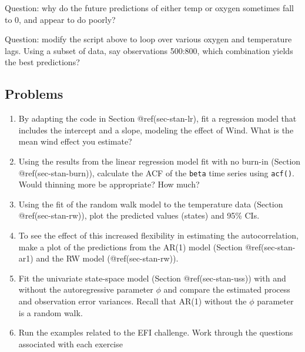 \documentclass[
]{article}
\begin{document}
Question: why do the future predictions of either temp or oxygen
sometimes fall to 0, and appear to do poorly?

Question: modify the script above to loop over various oxygen and
temperature lags. Using a subset of data, say observations 500:800,
which combination yields the best predictions?

\clearpage

\hypertarget{sec-stan-problems}{%
\subsection{Problems}\label{sec-stan-problems}}

\begin{enumerate}
\def\labelenumi{\arabic{enumi}.}
\item
  By adapting the code in Section @ref(sec-stan-lr), fit a regression
  model that includes the intercept and a slope, modeling the effect of
  Wind. What is the mean wind effect you estimate?
\item
  Using the results from the linear regression model fit with no burn-in
  (Section @ref(sec-stan-burn)), calculate the ACF of the \texttt{beta}
  time series using \texttt{acf()}. Would thinning more be appropriate?
  How much?
\item
  Using the fit of the random walk model to the temperature data
  (Section @ref(sec-stan-rw)), plot the predicted values (states) and
  95\% CIs.
\item
  To see the effect of this increased flexibility in estimating the
  autocorrelation, make a plot of the predictions from the AR(1) model
  (Section @ref(sec-stan-ar1) and the RW model (@ref(sec-stan-rw)).
\item
  Fit the univariate state-space model (Section @ref(sec-stan-uss)) with
  and without the autoregressive parameter \(\phi\) and compare the
  estimated process and observation error variances. Recall that AR(1)
  without the \(\phi\) parameter is a random walk.
\item
  Run the examples related to the EFI challenge. Work through the
  questions associated with each exercise
\end{enumerate}
\end{document}
